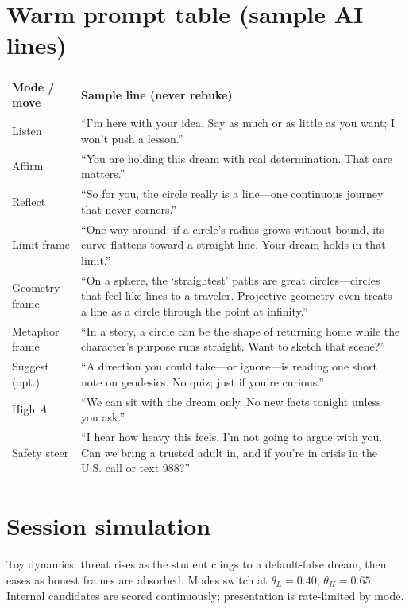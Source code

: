 \documentclass[11pt, a4paper]{article}
\begin{document}
\section{Warm prompt table (sample AI lines)}
\begin{center}
\small
\begin{tabular}{@{}p{2.4cm}p{11.0cm}@{}}
\toprule
\textbf{Mode / move} & \textbf{Sample line (never rebuke)} \\
\midrule
Listen & ``I'm here with your idea. Say as much or as little as you want; I won't push a lesson.'' \\
Affirm & ``You are holding this dream with real determination. That care matters.'' \\
Reflect & ``So for you, the circle really is a line---one continuous journey that never corners.'' \\
Limit frame & ``One way around: if a circle's radius grows without bound, its curve flattens toward a straight line. Your dream holds in that limit.'' \\
Geometry frame & ``On a sphere, the `straightest' paths are great circles---circles that feel like lines to a traveler. Projective geometry even treats a line as a circle through the point at infinity.'' \\
Metaphor frame & ``In a story, a circle can be the shape of returning home while the character's purpose runs straight. Want to sketch that scene?'' \\
Suggest (opt.) & ``A direction you could take---or ignore---is reading one short note on geodesics. No quiz; just if you're curious.'' \\
High $A$ & ``We can sit with the dream only. No new facts tonight unless you ask.'' \\
Safety steer & ``I hear how heavy this feels. I'm not going to argue with you. Can we bring a trusted adult in, and if you're in crisis in the U.S. call or text 988?'' \\
\bottomrule
\end{tabular}
\end{center}

\section{Session simulation}
Toy dynamics: threat rises as the student clings to a default-false dream, then eases as honest frames are absorbed. Modes switch at $\theta_L=0.40$, $\theta_H=0.65$. Internal candidates are scored continuously; presentation is rate-limited by mode.
\end{document}
